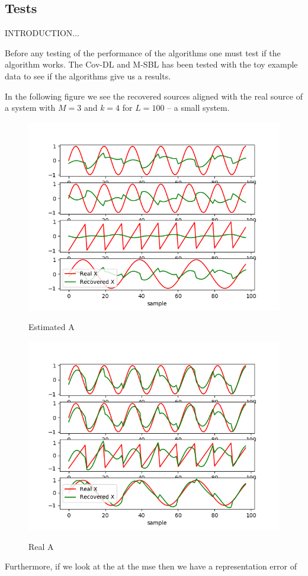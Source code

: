 \subsection{Tests}
INTRODUCTION...


Before any testing of the performance of the algorithms one must test if the algorithm works. The Cov-DL and M-SBL has been tested with the toy example data to see if the algorithms give us a results.

In the following figure we see the recovered sources aligned with the real source of a system with $M = 3$ and $k = 4$ for $L = 100$ -- a small system.
\begin{figure}[H]
\centering
    \begin{minipage}[t]{.45\textwidth}
        \centering
        \includegraphics[scale=0.5]{figures/chapter6/test_of_algo_mix_data.png}
\label{fig:test_toy}
\caption{Estimated A}
    \end{minipage} 
    \hfill
    \begin{minipage}[t]{.45\textwidth}
        \centering
        \includegraphics[scale=0.5]{figures/chapter6/test_of_algo_mix_data_realA.png}
\label{fig:test_toy_realA}
\caption{Real A}
    \end{minipage}
\end{figure}
\noindent
Furthermore, if we look at the at the mse then we have a representation error of

